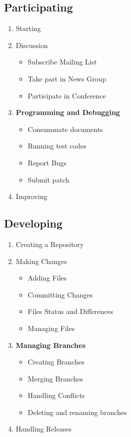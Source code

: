 \documentclass[draftclsnofoot,journal,onecolumn,12pt]{IEEEtran}
\begin{document}
\subsection{Participating}
\begin{enumerate}
  \item Starting
  \item Discussion
  \begin{itemize}
    \item Subscribe Mailing List
    \item Take part in News Group
    \item Participate in Conference
  \end{itemize}
  \item \textbf{Programming and Debugging}
  \begin{itemize}
    \item Consummate documents
    \item Running test codes
    \item Report Bugs
    \item Submit patch
  \end{itemize}
  \item Improving
\end{enumerate}

\subsection{Developing}
\begin{enumerate}
  \item Creating a Repository
  \item Making Changes
  \begin{itemize}
    \item Adding Files
    \item Committing Changes
    \item Files Status and Differences
    \item Managing Files
  \end{itemize}
  \item \textbf{Managing Branches}
  \begin{itemize}
    \item Creating Branches
    \item Merging Branches
    \item Handling Conflicts
    \item Deleting and renaming branches
\end{itemize}
  \item Handling Releases
\end{enumerate}
\end{document}
